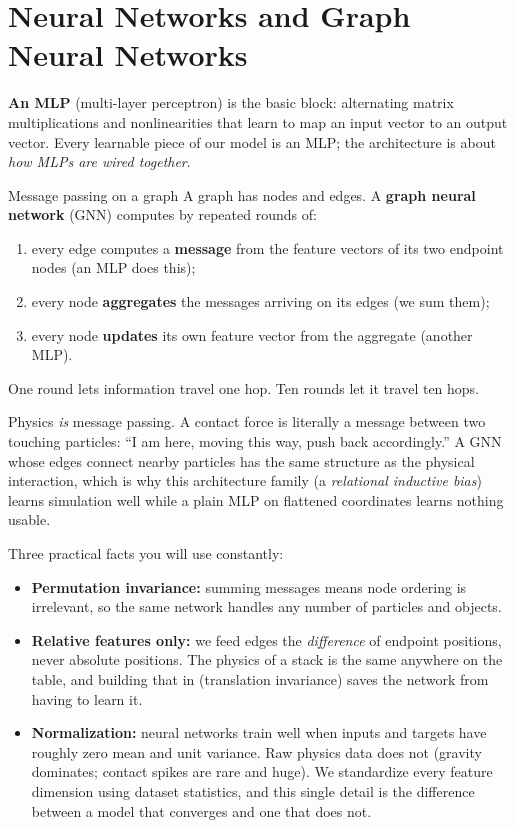 \documentclass[11pt]{article}
\begin{document}
\section{Neural Networks and Graph Neural Networks}

\textbf{An MLP} (multi-layer perceptron) is the basic block: alternating matrix multiplications and nonlinearities that learn to map an input vector to an output vector. Every learnable piece of our model is an MLP; the architecture is about \emph{how MLPs are wired together}.

\begin{concept}{Message passing on a graph}
A graph has nodes and edges. A \textbf{graph neural network} (GNN) computes by repeated rounds of:
\begin{enumerate}[itemsep=1pt]
  \item every edge computes a \textbf{message} from the feature vectors of its two endpoint nodes (an MLP does this);
  \item every node \textbf{aggregates} the messages arriving on its edges (we sum them);
  \item every node \textbf{updates} its own feature vector from the aggregate (another MLP).
\end{enumerate}
One round lets information travel one hop. Ten rounds let it travel ten hops.
\end{concept}

\begin{why}
Physics \emph{is} message passing. A contact force is literally a message between two touching particles: ``I am here, moving this way, push back accordingly.'' A GNN whose edges connect nearby particles has the same structure as the physical interaction, which is why this architecture family (a \emph{relational inductive bias}) learns simulation well while a plain MLP on flattened coordinates learns nothing usable.
\end{why}

Three practical facts you will use constantly:
\begin{itemize}[itemsep=2pt]
  \item \textbf{Permutation invariance:} summing messages means node ordering is irrelevant, so the same network handles any number of particles and objects.
  \item \textbf{Relative features only:} we feed edges the \emph{difference} of endpoint positions, never absolute positions. The physics of a stack is the same anywhere on the table, and building that in (translation invariance) saves the network from having to learn it.
  \item \textbf{Normalization:} neural networks train well when inputs and targets have roughly zero mean and unit variance. Raw physics data does not (gravity dominates; contact spikes are rare and huge). We standardize every feature dimension using dataset statistics, and this single detail is the difference between a model that converges and one that does not.
\end{itemize}
\end{document}
